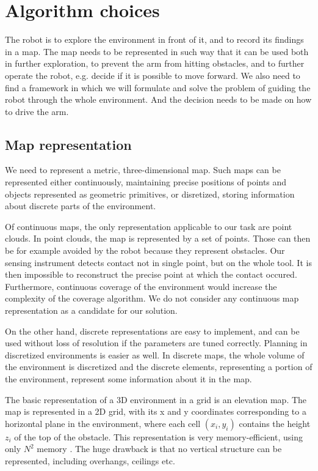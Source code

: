 \documentclass[buriama8_dp.tex]{subfiles}
\begin{document}
\chapter{Algorithm choices}


The robot is to explore the environment in front of it, and to record its findings in a map. The map needs to be represented in such way that it can be used both in further exploration, to prevent the arm from hitting obstacles, and to further operate the robot, e.g. decide if it is possible to move forward. We also need to find a framework in which we will formulate and solve the problem of guiding the robot through the whole environment. And the decision needs to be made on how to drive the arm.

\section{Map representation}

We need to represent a metric, three-dimensional map. Such maps can be represented either continuously, maintaining precise positions of points and objects represented as geometric primitives, or disretized, storing information about discrete parts of the environment.

Of continuous maps, the only representation applicable to our task are point clouds. In point clouds, the map is represented by a set of points. Those can then be for example avoided by the robot because they represent obstacles. Our sensing instrument detects contact not in single point, but on the whole tool. It is then impossible to reconstruct the precise point at which the contact occured. Furthermore, continuous coverage of the environment would increase the complexity of the coverage algorithm. We do not consider any continuous map representation as a candidate for our solution.

On the other hand, discrete representations are easy to implement, and can be used without loss of resolution if the parameters are tuned correctly. Planning in discretized environments is easier as well. In discrete maps, the whole volume of the environment is discretized and the discrete elements, representing a portion of the environment, represent some information about it in the map.

The basic representation of a 3D environment in a grid is an elevation map. The map is represented in a 2D grid, with its \m x and \m y coordinates corresponding to a horizontal plane in the environment, where each cell \((x_i, y_i)\) contains the height \(z_i\) of the top of the obstacle. This representation is very memory-efficient, using only \(N^2\) memory . The huge drawback is that no vertical structure can be represented, including overhangs, ceilings etc.
\end{document}
